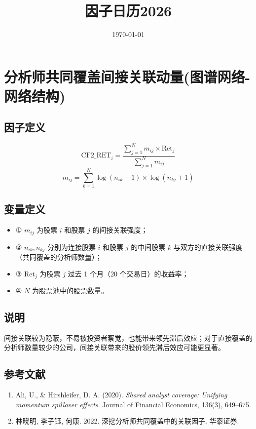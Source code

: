 \documentclass{article}
\title{因子日历2026}
\date{\today}
\begin{document}
\maketitle

\section{分析师共同覆盖间接关联动量(图谱网络-网络结构)}

\subsection{因子定义}

\begin{equation}
    \mathrm{CF2\_RET}_i = \frac{\sum_{j=1}^{N} m_{ij} \times \mathrm{Ret}_j}{\sum_{j=1}^{N} m_{ij}}
\end{equation}
\begin{equation}
    m_{ij} = \sum_{k=1}^{N} \log(n_{ik} + 1) \times \log(n_{kj} + 1)
\end{equation}

\subsection{变量定义}
\begin{itemize}
    \item ① \( m_{ij} \) 为股票 \( i \) 和股票 \( j \) 的间接关联强度；
    \item ② \( n_{ik}, n_{kj} \) 分别为连接股票 \( i \) 和股票 \( j \) 的中间股票 \( k \) 与双方的直接关联强度（共同覆盖的分析师数量）；
    \item ③ \( \mathrm{Ret}_j \) 为股票 \( j \) 过去 1 个月（20 个交易日）的收益率；
    \item ④ \( N \) 为股票池中的股票数量。
\end{itemize}

\subsection{说明}
间接关联较为隐蔽，不易被投资者察觉，也能带来领先滞后效应；对于直接覆盖的分析师数量较少的公司，间接关联带来的股价领先滞后效应可能更显著。

\subsection{参考文献}
\begin{enumerate}
    \item Ali, U., \& Hirshleifer, D. A. (2020). \textit{Shared analyst coverage: Unifying momentum spillover effects}. Journal of Financial Economics, 136(3), 649–675.
    \item 林晓明, 李子钰, 何康. 2022. 深挖分析师共同覆盖中的关联因子. 华泰证券.
\end{enumerate}
\end{document}
